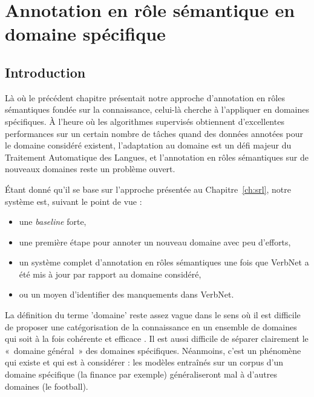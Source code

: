 

\chapter{Annotation en rôle sémantique en domaine spécifique}
\label{ch:domainsrl}

\section{Introduction}

Là où le précédent chapitre présentait notre approche d'annotation en rôles
sémantiques fondée sur la connaissance, celui-là cherche à l'appliquer en
domaines spécifiques. À l'heure où les algorithmes supervisés obtiennent
d'excellentes performances sur un certain nombre de tâches quand des données
annotées pour le domaine considéré existent, l'adaptation au domaine est un
défi majeur du Traitement Automatique des Langues, et l'annotation en rôles
sémantiques sur de nouveaux domaines reste un problème ouvert. 

Étant donné qu'il se base sur l'approche présentée au Chapitre~\ref{ch:srl},
notre système est, suivant le point de vue :
\begin{itemize}
    \item une \textit{baseline} forte,
    \item une première étape pour annoter un nouveau domaine avec peu d'efforts,
    \item un système complet d'annotation en rôles sémantiques une fois que
        VerbNet a été mis à jour par rapport au domaine considéré,
    \item ou un moyen d'identifier des manquements dans VerbNet.
\end{itemize}

La définition du terme 'domaine' reste assez vague dans le sens où il est
difficile de proposer une catégorisation de la connaissance en un ensemble de
domaines qui soit à la fois cohérente et efficace \citep{ma2012rethinking}. Il
est aussi difficile de séparer clairement le «~domaine général~» des domaines
spécifiques. Néanmoins, c'est un phénomène qui existe et qui est à considérer :
les modèles entraînés sur un corpus d'un domaine spécifique (la finance par
exemple) généraliseront mal à d'autres domaines (le football).

